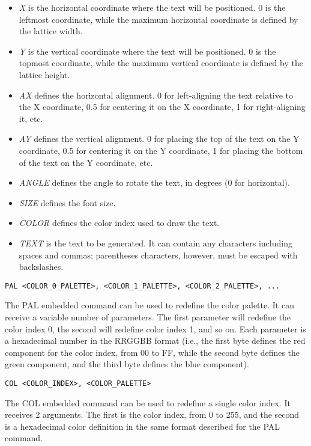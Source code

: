 \documentclass[a4paper]{article}
\begin{document}
\begin{itemize}
  \item \textit{X} is the horizontal coordinate where the text will be positioned. 0 is the leftmost coordinate, while the maximum horizontal coordinate is defined by the lattice width.
  \item \textit{Y} is the vertical coordinate where the text will be positioned. 0 is the topmost coordinate, while the maximum vertical coordinate is defined by the lattice height.
  \item \textit{AX} defines the horizontal alignment. 0 for left-aligning the text relative to the X coordinate, 0.5 for centering it on the X coordinate, 1 for right-aligning it, etc.
  \item \textit{AY} defines the vertical alignment. 0 for placing the top of the text on the Y coordinate, 0.5 for centering it on the Y coordinate, 1 for placing the bottom of the text on the Y coordinate, etc.
  \item \textit{ANGLE} defines the angle to rotate the text, in degrees (0 for horizontal).
  \item \textit{SIZE} defines the font size.
  \item \textit{COLOR} defines the color index used to draw the text.
  \item \textit{TEXT} is the text to be generated. It can contain any characters including spaces and commas; parentheses characters, however, must be escaped with backslashes.
\end{itemize} 
\bigbreak\bigbreak

\texttt{PAL <COLOR\_0\_PALETTE>, <COLOR\_1\_PALETTE>, <COLOR\_2\_PALETTE>, ...}
\bigbreak

The PAL embedded command can be used to redefine the color palette. It can receive a variable number of parameters. The first parameter will redefine the color index 0, the second will redefine color index 1, and so on. Each parameter is a hexadecimal number in the RRGGBB format (i.e., the first byte defines the red component for the color index, from 00 to FF, while the second byte defines the green component, and the third byte defines the blue component).
\bigbreak\bigbreak

\texttt{COL <COLOR\_INDEX>, <COLOR\_PALETTE>}
\bigbreak

The COL embedded command can be used to redefine a single color index. It receives 2 arguments. The first is the color index, from 0 to 255, and the second is a hexadecimal color definition in the same format described for the PAL command.
\bigbreak\bigbreak
\end{document}
